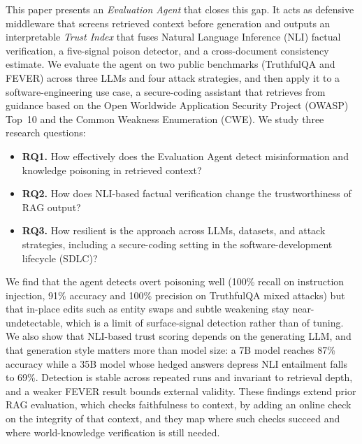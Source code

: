 This paper presents an \emph{Evaluation Agent} that closes this gap. It acts as defensive middleware that screens retrieved context before generation and outputs an interpretable \emph{Trust Index} that fuses Natural Language Inference (NLI) factual verification, a five-signal poison detector, and a cross-document consistency estimate. We evaluate the agent on two public benchmarks (TruthfulQA and FEVER) across three LLMs and four attack strategies, and then apply it to a software-engineering use case, a secure-coding assistant that retrieves from guidance based on the Open Worldwide Application Security Project (OWASP) Top~10 and the Common Weakness Enumeration (CWE). We study three research questions:
\begin{itemize}
  \item \textbf{RQ1.} How effectively does the Evaluation Agent detect misinformation and knowledge poisoning in retrieved context?
  \item \textbf{RQ2.} How does NLI-based factual verification change the trustworthiness of RAG output?
  \item \textbf{RQ3.} How resilient is the approach across LLMs, datasets, and attack strategies, including a secure-coding setting in the software-development lifecycle (SDLC)?
\end{itemize}

We find that the agent detects overt poisoning well (100\% recall on instruction injection, 91\% accuracy and 100\% precision on TruthfulQA mixed attacks) but that in-place edits such as entity swaps and subtle weakening stay near-undetectable, which is a limit of surface-signal detection rather than of tuning. We also show that NLI-based trust scoring depends on the generating LLM, and that generation style matters more than model size: a 7B model reaches 87\% accuracy while a 35B model whose hedged answers depress NLI entailment falls to 69\%. Detection is stable across repeated runs and invariant to retrieval depth, and a weaker FEVER result bounds external validity. These findings extend prior RAG evaluation, which checks faithfulness to context, by adding an online check on the integrity of that context, and they map where such checks succeed and where world-knowledge verification is still needed.

